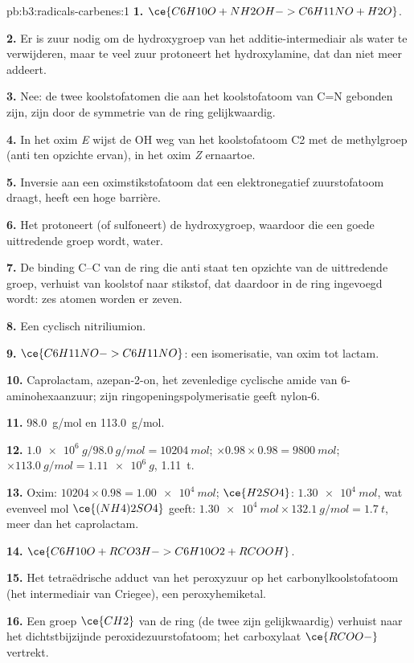 \begin{solution}{pb:b3:radicals-carbenes:1}
\textbf{1.} $\ce{C6H10O + NH2OH -> C6H11NO + H2O}$.

\textbf{2.} Er is zuur nodig om de hydroxygroep van het additie-intermediair
als water te verwijderen, maar te veel zuur protoneert het
hydroxylamine, dat dan niet meer addeert.

\textbf{3.} Nee: de twee koolstofatomen die aan het koolstofatoom van C=N gebonden zijn, zijn door de
symmetrie van de ring gelijkwaardig.

\textbf{4.} In het oxim \textit{E} wijst de OH weg van het koolstofatoom C2 met de methylgroep (anti ten opzichte
ervan), in het oxim \textit{Z} ernaartoe.

\textbf{5.} Inversie aan een oximstikstofatoom dat een elektronegatief
zuurstofatoom draagt, heeft een hoge barrière.

\textbf{6.} Het protoneert (of sulfoneert) de hydroxygroep, waardoor die
een goede uittredende groep wordt, water.

\textbf{7.} De binding C--C van de ring die anti staat ten opzichte van de
uittredende groep, verhuist van koolstof naar stikstof, dat daardoor in
de ring ingevoegd wordt: zes atomen worden er zeven.

\textbf{8.} Een cyclisch nitriliumion.

\textbf{9.} $\ce{C6H11NO -> C6H11NO}$: een isomerisatie, van oxim tot lactam.

\textbf{10.} Caprolactam, azepan-2-on, het zevenledige cyclische amide van
6-aminohexaanzuur; zijn ringopeningspolymerisatie geeft nylon-6.

\textbf{11.} \qty{98.0}{g/mol} en \qty{113.0}{g/mol}.

\textbf{12.} $\qty{1.0e6}{g}/\qty{98.0}{g/mol} = \qty{10204}{mol}$; $\times 0.98 \times 0.98 = \qty{9800}{mol}$; $\times \qty{113.0}{g/mol} = \qty{1.11e6}{g}$, \qty{1.11}{t}.

\textbf{13.} Oxim: $\num{10204} \times 0.98 = \qty{1.00e4}{mol}$; $\ce{H2SO4}$: $\qty{1.30e4}{mol}$, wat evenveel mol
$\ce{(NH4)2SO4}$ geeft: $\qty{1.30e4}{mol} \times \qty{132.1}{g/mol} = \qty{1.7}{t}$, meer dan het caprolactam.

\textbf{14.} $\ce{C6H10O + RCO3H -> C6H10O2 + RCOOH}$.

\textbf{15.} Het tetraëdrische adduct van het peroxyzuur op het
carbonylkoolstofatoom (het intermediair van Criegee), een
peroxyhemiketal.

\textbf{16.} Een groep $\ce{CH2}$ van de ring (de twee zijn gelijkwaardig) verhuist naar het dichtstbijzijnde
peroxidezuurstofatoom; het carboxylaat $\ce{RCOO-}$ vertrekt.


\end{solution}
